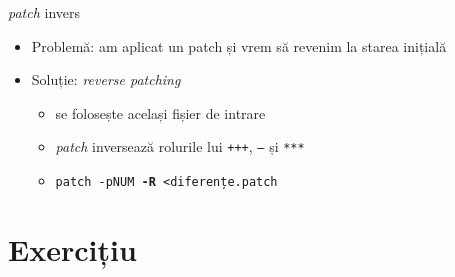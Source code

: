 \documentclass{beamer}
\begin{document}
\begin{frame}{\textit{patch} invers}
  \begin{itemize}[<+->]
  \item Problemă: am aplicat un patch și vrem să revenim la starea inițială
  \item Soluție: \textit{reverse patching}
    \begin{itemize}
    \item se folosește același fișier de intrare
    \item \textit{patch} inversează rolurile lui \texttt{+++}, \texttt{---} și \texttt{***}
    \item \texttt{patch -pNUM \textbf{-R} \textless diferențe.patch}
    \end{itemize}
  \end{itemize}
\end{frame}

\section{Exercițiu}
\frame{\tableofcontents[currentsection]}
\end{document}
